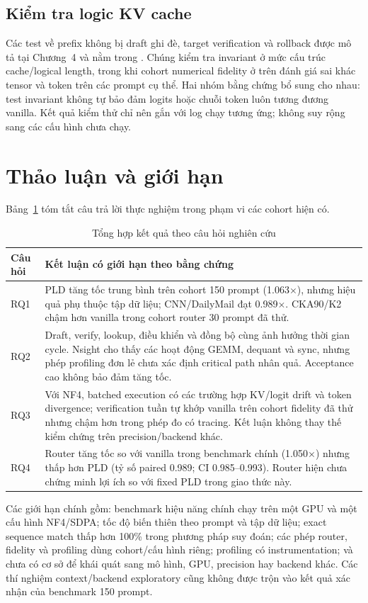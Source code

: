 \subsection{Kiểm tra logic KV cache}
Các test về prefix không bị draft ghi đè, target verification và rollback được mô tả tại Chương~4 và nằm trong . Chúng kiểm tra invariant ở mức cấu trúc cache/logical length, trong khi cohort numerical fidelity ở trên đánh giá sai khác tensor và token trên các prompt cụ thể. Hai nhóm bằng chứng bổ sung cho nhau: test invariant không tự bảo đảm logits hoặc chuỗi token luôn tương đương vanilla. Kết quả kiểm thử chỉ nên gắn với log chạy tương ứng; không suy rộng sang các cấu hình chưa chạy.

\section{Thảo luận và giới hạn}

Bảng~\ref{tab:ch5-rq} tóm tắt câu trả lời thực nghiệm trong phạm vi các cohort hiện có.

\begin{table}[htbp]
\centering
\small
\caption{Tổng hợp kết quả theo câu hỏi nghiên cứu}
\label{tab:ch5-rq}
\begin{tabularx}{\textwidth}{@{}p{1.3cm}X@{}}
\toprule
\textbf{Câu hỏi} & \textbf{Kết luận có giới hạn theo bằng chứng} \\
\midrule
RQ1 & PLD tăng tốc trung bình trên cohort 150 prompt (1.063\(\times\)), nhưng hiệu quả phụ thuộc tập dữ liệu; CNN/DailyMail đạt 0.989\(\times\). CKA90/K2 chậm hơn vanilla trong cohort router 30 prompt đã thử. \\
RQ2 & Draft, verify, lookup, điều khiển và đồng bộ cùng ảnh hưởng thời gian cycle. Nsight cho thấy các hoạt động GEMM, dequant và sync, nhưng phép profiling đơn lẻ chưa xác định critical path nhân quả. Acceptance cao không bảo đảm tăng tốc. \\
RQ3 & Với NF4, batched execution có các trường hợp KV/logit drift và token divergence; verification tuần tự khớp vanilla trên cohort fidelity đã thử nhưng chậm hơn trong phép đo có tracing. Kết luận không thay thế kiểm chứng trên precision/backend khác. \\
RQ4 & Router tăng tốc so với vanilla trong benchmark chính (1.050\(\times\)) nhưng thấp hơn PLD (tỷ số paired 0.989; CI 0.985--0.993). Router hiện chưa chứng minh lợi ích so với fixed PLD trong giao thức này. \\
\bottomrule
\end{tabularx}
\end{table}
Các giới hạn chính gồm: benchmark hiệu năng chính chạy trên một GPU và một cấu hình NF4/SDPA; tốc độ biến thiên theo prompt và tập dữ liệu; exact sequence match thấp hơn 100\% trong phương pháp suy đoán; các phép router, fidelity và profiling dùng cohort/cấu hình riêng; profiling có instrumentation; và chưa có cơ sở để khái quát sang mô hình, GPU, precision hay backend khác. Các thí nghiệm context/backend exploratory cũng không được trộn vào kết quả xác nhận của benchmark 150 prompt.


